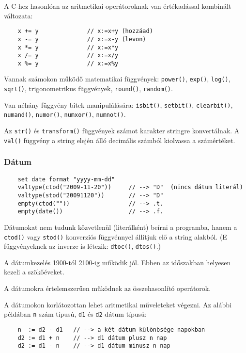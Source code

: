 A C-hez hasonlóan az aritmetikai operátoroknak van  értékadással
kombinált változata:
\begin{verbatim}
    x += y              // x:=x+y (hozzáad)
    x -= y              // x:=x-y (levon)
    x *= y              // x:=x*y
    x /= y              // x:=x/y
    x %= y              // x:=x%y
\end{verbatim}

Vannak számokon működő matematikai függvények:
\verb!power()!,
\verb!exp()!,
\verb!log()!,
\verb!sqrt()!,
trigonometrikus függvények,
\verb!round()!,
\verb!random()!.

Van néhány függvény bitek manipulálására:
\verb!isbit()!,
\verb!setbit()!,
\verb!clearbit()!,
\verb!numand()!,
\verb!numor()!,
\verb!numxor()!,
\verb!numnot()!.

Az \verb!str()! és \verb!transform()! 
függvények számot karakter stringre konvertálnak.
A \verb!val()! függvény  a string elején álló decimális
számból kiolvassa a számértéket.



\subsubsection{Dátum}

\begin{verbatim}
    set date format "yyyy-mm-dd"
    valtype(ctod("2009-11-20"))     // --> "D"  (nincs dátum literál)
    valtype(stod("20091120"))       // --> "D"
    empty(ctod(""))                 // --> .t.
    empty(date())                   // --> .f.
\end{verbatim}

Dátumokat nem tudunk közvetlenül (literálként) beírni a programba,
hanem a \verb!ctod()! vagy \verb!stod()! konverziós függvénnyel állítjuk
elő a string alakból. (E függvényeknek az inverze is létezik: 
\verb!dtoc()!, \verb!dtos()!.)

A dátumkezelés 1900-tól 2100-ig működik jól. Ebben az időszakban
helyesen kezeli a szökőéveket.


A dátumokra értelemszerűen működnek az összehasonlító operátorok.

A dátumokon korlátozottan lehet aritmetikai műveleteket végezni.
Az alábbi példában \verb!n! szám típusú, \verb!d1! és \verb!d2!
dátum típusú:
\begin{verbatim}
    n  := d2 - d1   // --> a két dátum különbsége napokban
    d2 := d1 + n    // --> d1 dátum plusz n nap
    d2 := d1 - n    // --> d1 dátum minusz n nap
\end{verbatim}

